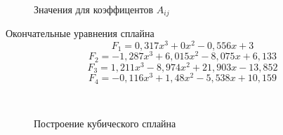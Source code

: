 \documentclass[russian,utf8,nocolumnxxxi,nocolumnxxxii]{eskdtext}
\begin{document}
\begin{figure}[H]
 \\
\caption{Значения для коэффицентов $A_{ij}$}
\end{figure}

Окончательные уравнения сплайна
$$F_1=0,317x^3+0x^2-0,556x+3$$
$$F_2=-1,287x^3+6,015x^2-8,075x+6,133$$
$$F_3=1,211x^3-8,974x^2+21,903x-13,852$$
$$F_4=-0,116x^3+1,48x^2-5,538x+10,159$$

\begin{figure}[H]
 \\
\caption{Построение кубического сплайна}
\end{figure}
\end{document}

